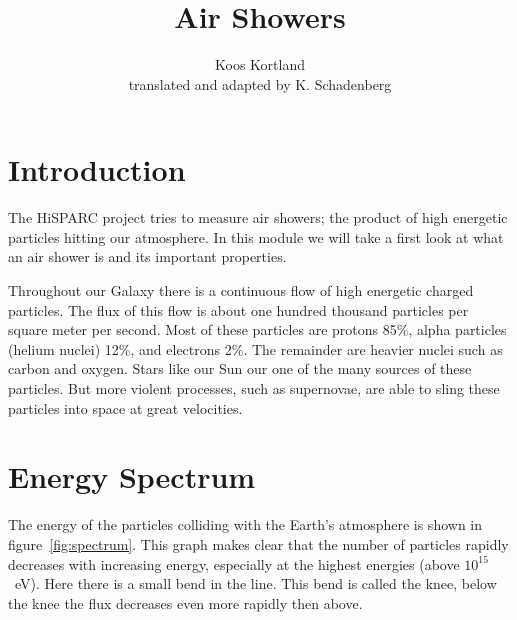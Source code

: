 \documentclass[12pt,a4paper]{article}
\author{Koos Kortland \\ translated and adapted by K. Schadenberg}
\date{}
\title{Air Showers}
\numberwithin{equation}{section}
\numberwithin{figure}{section}
\numberwithin{table}{section}
\begin{document}
\maketitle

\section{Introduction}
The HiSPARC project tries to measure air showers; the product of high energetic particles hitting our atmosphere. In this module we will take a first look at what an air shower is and its important properties.

Throughout our Galaxy there is a continuous flow of high energetic charged particles. The flux of this flow is about one hundred thousand particles per square meter per second. Most of these particles are protons 85\%, alpha particles (helium nuclei) 12\%, and electrons 2\%. The remainder are heavier nuclei such as carbon and oxygen. Stars like our Sun our one of the many sources of these particles. But more violent processes, such as supernovae, are able to sling these particles into space at great velocities.

\section{Energy Spectrum}
The energy of the particles colliding with the Earth's atmosphere is shown in figure~\ref{fig:spectrum}. This graph makes clear that the number of particles rapidly decreases with increasing energy, especially at the highest energies (above $10^{15}$~eV). Here there is a small bend in the line. This bend is called the knee, below the knee the flux decreases even more rapidly then above.
\end{document}

